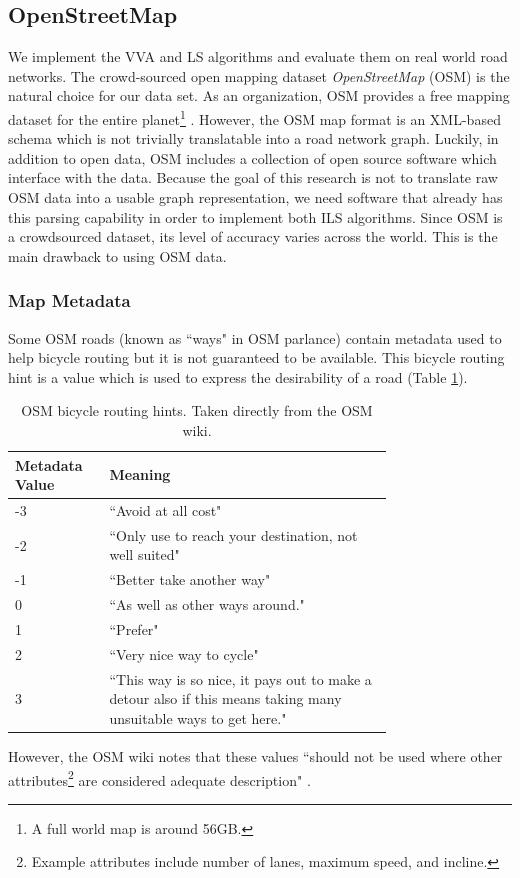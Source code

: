 \documentclass[honors]{union-cs-thesis}
\begin{document}
\subsection{OpenStreetMap}
We implement the VVA and LS algorithms and evaluate them on real world road networks. The crowd-sourced open mapping dataset \emph{OpenStreetMap} (OSM) is the natural choice for our data set. As an organization, OSM  provides a free mapping dataset for the entire planet\footnote{A full world map is around 56GB.} \cite{osm}. However, the OSM map format is an XML-based schema which is not trivially translatable into a road network graph. Luckily, in addition to open data, OSM includes a collection of open source software which interface with the data. Because the goal of this research is not to translate raw OSM data into a usable graph representation, we need software that already has this parsing capability in order to implement both ILS algorithms. Since OSM is a crowdsourced dataset, its level of accuracy varies across the world. This is the main drawback to using OSM data. 

\subsubsection{Map Metadata}
Some OSM roads (known as ``ways" in OSM parlance) contain metadata used to help bicycle routing but it is not guaranteed to be available. This bicycle routing hint is a value which is used to express the desirability of a road (Table \ref{tab:osm-hint}).  
\begin{table}[h]
\begin{center}
    \begin{tabular}{|l|p{0.75\linewidth}|}
        \hline
        \textbf{Metadata Value} & \textbf{Meaning} \\
        \hline
        -3 & ``Avoid at all cost" \\
        \hline
        -2 & ``Only use to reach your destination, not well suited" \\
        \hline
        -1 & ``Better take another way" \\
        \hline
        0 & ``As well as other ways around." \\
        \hline
        1 & ``Prefer" \\
        \hline
        2 & ``Very nice way to cycle" \\
        \hline
        3 & ``This way is so nice, it pays out to make a detour also if this means taking many unsuitable ways to get here." \\
        \hline
    \end{tabular}
\end{center}
\caption{OSM bicycle routing hints. Taken directly from the OSM wiki.}
\label{tab:osm-hint}
\end{table}
However, the OSM wiki notes that these values ``should not be used where other attributes\footnote{Example attributes include number of lanes, maximum speed, and incline.} are considered adequate description" \cite{osm}.
\end{document}
